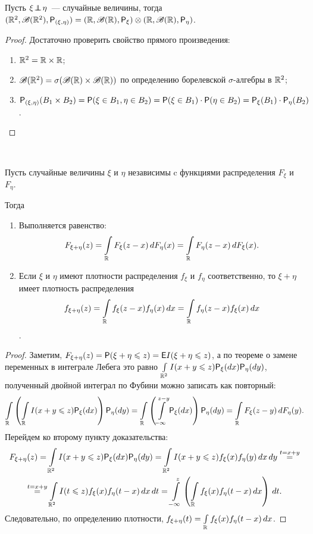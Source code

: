 \begin{statement}
 	Пусть $\xi \indep \eta$~--- случайные величины, тогда $(\R^2, \B(\R^2), \P_{(\xi, \eta)}) = (\R, \B(\R), \P_\xi) \otimes (\R, \B(\R), \P_\eta)$.
 	\begin{proof} Достаточно проверить свойство прямого произведения:
 		\begin{enumerate}
 			\item $\R^2 = \R \times \R$;
 			\item $\B(\R^2) = \sigma(\B(\R) \times \B(\R))$ по определению борелевской $\sigma$-алгебры в $\R^2$;
 			\item $\P_{(\xi, \eta)} (B_1 \times B_2) = \P(\xi \in B_1, \eta \in B_2) = \P(\xi \in B_1) \cdot \P(\eta \in B_2) = \P_\xi(B_1) \cdot \P_\eta (B_2)$. \qedhere
 		\end{enumerate}
 	\end{proof}
\end{statement}

\begin{lemma}[о свертке]~

	Пусть случайные величины $\xi$ и $\eta$ независимы c функциями распределения $F_\xi$ и $F_\eta$.
	
	Тогда
	\begin{enumerate}
	    \item Выполняется равенство: $$ F_{\xi + \eta} (z) = \int\limits_\R F_\xi (z - x) \, dF_\eta (x) = \int\limits_\R F_\eta(z - x) \, d F_\xi(x).$$
	    \item Если $\xi$ и $\eta$ имеют плотности распределения $f_\xi$ и $f_\eta$ соответственно, то $\xi + \eta$ имеет плотность распределения $$f_{\xi + \eta} (z) = \int\limits_\R f_\xi (z - x) f_\eta (x) \, dx = \int\limits_\R f_\eta (z - x) f_\xi(x) \, dx$$.
	\end{enumerate} 
	
	\begin{proof}
		Заметим, $F_{\xi + \eta} (z) = \P ( \xi + \eta \leqslant z) = \E I(\xi + \eta \leqslant z)$, а по теореме о замене переменных в интеграле Лебега это равно $\int\limits_{\R^2} I(x + y \leqslant z) \P_\xi(dx) \P_\eta(dy)$, полученный двойной интеграл по Фубини можно записать как повторный:
		$$ \int\limits_\R \left( \int\limits_\R I(x + y \leqslant z) \P_\xi(dx) \right) \P_\eta(dy) = \int\limits_\R \left( \int\limits_{-\infty}^{z-y} \P_\xi(dx) \right) \P_\eta(dy) = \int\limits_\R F_\xi(z - y) \, dF_\eta(y).$$
		Перейдем ко второму пункту доказательства:
		\begin{multline*}
			F_{\xi + \eta} (z) = \int\limits_{\R^2} I(x + y \leqslant z) \P_\xi(dx) \P_\eta(dy) = \int\limits_{\R^2} I(x + y \leqslant z) f_\xi(x) f_\eta(y) \, dx\,dy \overset{t = x+y}{=} \\ \overset{t = x+y}{=} \int\limits_{\R^2} I(t \leqslant z) f_\xi(x) f_\eta(t - x) \, dx\,dt = \int\limits_{-\infty}^z \left( \int\limits_\R f_\xi(x) f_\eta(t-x) \, dx \right) \, dt.
		\end{multline*}
		Следовательно, по определению плотности, $f_{\xi+\eta}(t) = \int\limits_\R f_\xi(x) f_\eta(t-x) \, dx$.
	\end{proof}
\end{lemma}

